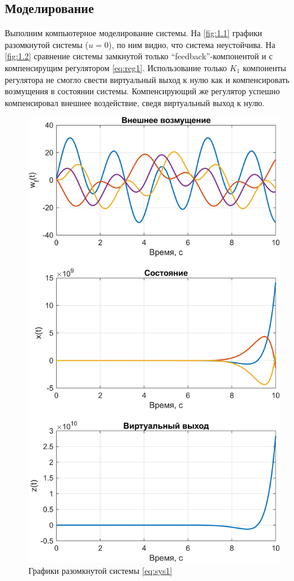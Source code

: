 \subsection{Моделирование}
Выполним компьютерное моделирование системы. На \autoref{fig:1.1} графики
разомкнутой системы ($u=0$), по ним видно, что система неустойчива. На
\autoref{fig:1.2} сравнение системы замкнутой только ``feedback''-компонентой
и с компенсирущим регулятором \eqref{eq:reg1}. Использование только $K_1$
компоненты регулятора не смогло свести виртуальный выход к нулю как и
компенсировать возмущения в состоянии системы. 
Компенсирующий же регулятор успешно компенсировал внешнее воздействие,
сведя виртуальный выход к нулю.
\begin{figure}[H]
    \centering
    \includegraphics[width=0.8\linewidth]{figs/task1_1.png}
    \caption{Графики разомкнутой системы \eqref{eq:sys1}}
    \label{fig:1.1}
\end{figure}
